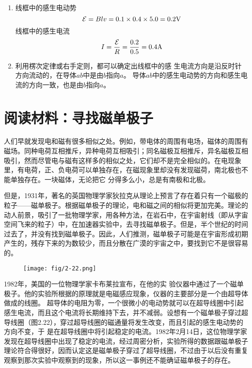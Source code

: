 \begin{solution}
\begin{enumerate}
    \item 线框中的感生电动势
\[\mathcal{E}=Blv=0.1\times0.4\times5.0=0.2{\rm V}\]    
线框中的感生电流
\[I=\frac{\mathcal{E}}{R}=\frac{0.2}{0.5}=0.4{\rm A}\]

\item 利用楞次定律或右手定则，都可以确定出线框中的感
生电流方向是沿反时针方向流动的，在导体$ab$中是由$b$指向$a$。 导体$ab$中的感生电动势的方向和感生电流的方向一致，也是由$b$指向$a$。
\end{enumerate}
\end{solution}
   
\section*{阅读材料：寻找磁单极子}
人们早就发现电和磁有很多相似之处。例如，带电体的周围有电场，磁体的周围有磁场。同种电荷互相推斥，异种电荷互相吸引；同名磁极互相推斥，异名磁极互相吸引，然而尽管电与磁有这样多的相似之处，它们却不是完全相似的。在电现象里，有电荷，正、负电荷可以单独存在，在磁现象里却没有发现磁荷，南北极也不能单独存在。一块磁体，无论把它
分得多么小，总是有南极和北极。

但是，1931年，著名的英国物理学家狄拉克从理论上预言了存在着只有一个磁极的粒子——磁单极子。根据磁单极子的理论，电和磁之间的相似将更加完美。理论的动人前景，吸引了一批物理学家，用各种方法，在岩石中，在宇宙射线（即从字宙空间飞来的粒子）中，在加速器实验中，去寻找磁单极子。但是，半个世纪的时间过去了，并没有找到磁单极子。因此，人们推测，磁单极子可能是在宇宙形成初期产生的，残存下来的为数较少，而且分散在广漠的宇宙之中，要找到它不是很容易的。
\begin{figure}[htp]\centering
\texttt{[image: fig/2-22.png]}
\caption{}
\end{figure}

1982年，美国的一位物理学家卡布莱拉宣布，在他的实
验仪器中通过了一个磁单极子。他的实验所根据的原理就是电磁感应现象，仪器的主要部分是一个由超导体做成的线圈。
超导体的电阻为零，一个很微小的电动势就可以在超导线圈中引起感生电流，而且这个电流将长期维持下去，并不减弱。设想有一个磁单极子穿过超导线圈（图2.22），穿过超导线圈的磁通量将发生改变，而且引起的感生电动势的方向不变，于
是在超导线圈中将引起稳定的电流。1982年2月14日，这位物理学家发现在超导线圈中出现了稳定的电流，经过周密分析，实验所得的数据跟磁单极子理论符合得很好，因而认定这是磁单极子穿过了超导线圈，不过由于以后没有重复观察到那次实验中观察到的现象，所以这一事例还不能确证磁单极子的存在。

